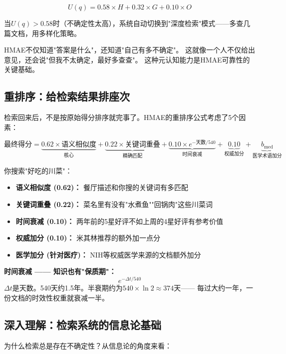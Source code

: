 \documentclass[11pt,a4paper]{ctexart}
\begin{document}
$$U(q) = 0.58 \times H + 0.32 \times G + 0.10 \times O$$

当$U(q) > 0.58$时（不确定性太高），系统自动切换到"深度检索"模式——多查几篇文档，用多样化策略。

\begin{keybox}
HMAE不仅知道"答案是什么"，还知道"自己有多不确定"。
这就像一个人不仅给出意见，还会说"但我不太确定，最好多查查"。
这种元认知能力是HMAE可靠性的关键基础。
\end{keybox}

\subsection{重排序：给检索结果排座次}

检索回来后，不是按原始得分排序就完事了。HMAE的重排序公式考虑了5个因素：

$$\text{最终得分} = \underbrace{0.62 \times \text{语义相似度}}_{\text{核心}} + \underbrace{0.22 \times \text{关键词重叠}}_{\text{精确匹配}} + \underbrace{0.10 \times e^{-\text{天数}/540}}_{\text{时间衰减}} + \underbrace{0.10}_{\text{权威加分}} + \underbrace{b_{\text{med}}}_{\text{医学术语加分}}$$

\begin{exambox}
你搜索"好吃的川菜"：
\begin{itemize}[nosep]
\item \textbf{语义相似度 (0.62)：} 餐厅描述和你搜的关键词有多匹配
\item \textbf{关键词重叠 (0.22)：} 菜名里有没有"水煮鱼""回锅肉"这些川菜词
\item \textbf{时间衰减 (0.10)：} 两年前的5星好评不如上周的4星好评有参考价值
\item \textbf{权威加分 (0.10)：} 米其林推荐的额外加一点分
\item \textbf{医学加分 (针对医疗)：} NIH等权威医学来源的文档额外加分
\end{itemize}
\end{exambox}

\textbf{时间衰减 —— 知识也有"保质期"：}
$$e^{-\Delta t / 540}$$
$\Delta t$是天数。540天约1.5年。半衰期约为$540 \times \ln 2 \approx 374$天——
每过大约一年，一份文档的时效性权重就衰减一半。

\subsection{深入理解：检索系统的信息论基础}

为什么检索总是存在不确定性？从信息论的角度来看：
\end{document}
